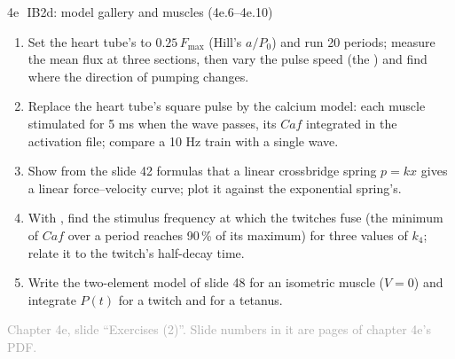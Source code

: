 \documentclass[aspectratio=169,11pt]{beamer}
\newcommand{\sourcecredit}[1]{\vfill\begin{flushright}\tiny\textcolor{DarkGray}{#1}\end{flushright}}
\begin{document}
\begin{frame}{4e\,\textbullet\ IB2d: model gallery and muscles (4e.6--4e.10)}
\label{fr:c4ex6}
\small
\begin{enumerate}
  
  \item[4e.6] Set the heart tube's  to $0.25\,F_{\max}$ (Hill's $a/P_0$) and run 20 periods; measure the mean flux at three sections, then vary the pulse speed (the ) and find where the direction of pumping changes.
  \item[4e.7] Replace the heart tube's square pulse by the calcium model: each muscle stimulated for 5 ms when the wave passes, its $Caf$ integrated in the activation file; compare a 10 Hz train with a single wave.
  \item[4e.8] Show from the slide 42 formulas that a linear crossbridge spring $p = kx$ gives a linear force--velocity curve; plot it against the exponential spring's.
  \item[4e.9] With , find the stimulus frequency at which the twitches fuse (the minimum of $Caf$ over a period reaches 90\,\% of its maximum) for three values of $k_4$; relate it to the twitch's half-decay time.
  \item[4e.10] Write the two-element model of slide 48 for an isometric muscle ($V = 0$) and integrate $P(t)$ for a twitch and for a tetanus.
\end{enumerate}
\sourcecredit{Chapter 4e, slide ``Exercises (2)''. Slide numbers in it are pages of chapter 4e's PDF.}
\end{frame}
\end{document}
